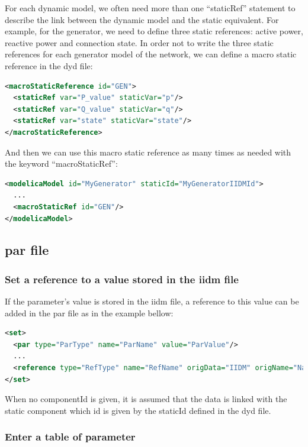 \documentclass[a4paper, 12pt]{report}
\begin{document}
For each dynamic model, we often need more than one ``staticRef'' statement to describe the link between the dynamic model and the static equivalent. For example, for the generator, we need to define three static references: active power, reactive power and connection state. In order not to write the three static references for each generator model of the network, we can define a macro static reference in the dyd file:
\begin{lstlisting}[language=XML, morekeywords={macroStaticReference}]
<macroStaticReference id="GEN">
  <staticRef var="P_value" staticVar="p"/>
  <staticRef var="Q_value" staticVar="q"/>
  <staticRef var="state" staticVar="state"/>
</macroStaticReference>
\end{lstlisting}

And then we can use this macro static reference as many times as needed with the keyword ``macroStaticRef'':
\begin{lstlisting}[language=XML, morekeywords={macroStaticRef}]
<modelicaModel id="MyGenerator" staticId="MyGeneratorIIDMId">
  ...
  <macroStaticRef id="GEN"/>
</modelicaModel>
\end{lstlisting}

\subsection{par file}

\subsubsection{Set a reference to a value stored in the iidm file}
\label{sec:Set a reference to a value stored in the iidm file}

If the parameter's value is stored in the iidm file, a reference to this value can be added in the par file as in the example bellow:
\begin{lstlisting}[language=XML, morekeywords={reference}]
<set>
  <par type="ParType" name="ParName" value="ParValue"/>
  ...
  <reference type="RefType" name="RefName" origData="IIDM" origName="NameIIDM" componentId="Model_id_in_iidm_File"/>
</set>
\end{lstlisting}

When no componentId is given, it is assumed that the data is linked with the static component which id is given by the staticId defined in the dyd file.

\subsubsection{Enter a table of parameter}
\end{document}
